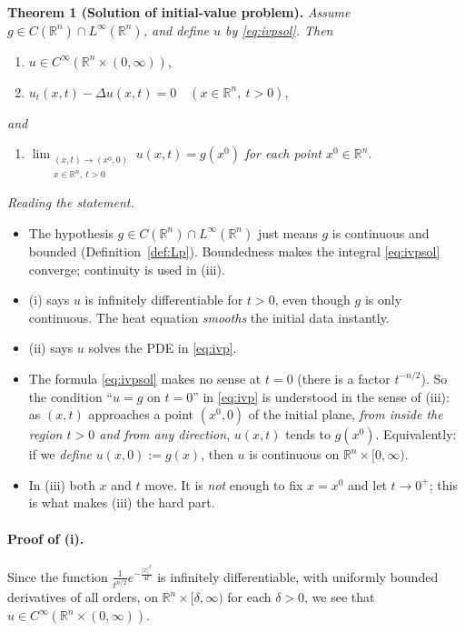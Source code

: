 \documentclass[11pt]{article}
\theoremstyle{plain}
\theoremstyle{definition}
\theoremstyle{remark}
\begin{document}
\bigskip
\textbf{Theorem 1 (Solution of initial-value problem).} \textit{Assume $g \in C(\mathbb{R}^n) \cap L^\infty(\mathbb{R}^n)$, and define $u$ by \eqref{eq:ivpsol}. Then}
\begin{enumerate}
    \item[(i)] $u \in C^\infty(\mathbb{R}^n \times (0,\infty))$,
    \item[(ii)] $u_t(x,t) - \Delta u(x,t) = 0 \quad (x \in \mathbb{R}^n,\ t > 0)$,
\end{enumerate}
\textit{and}
\begin{enumerate}
    \item[(iii)] $\displaystyle\lim_{\substack{(x,t)\to(x^0,0)\\ x\in\mathbb{R}^n,\ t>0}} u(x,t) = g(x^0)$ \textit{for each point $x^0 \in \mathbb{R}^n$.}
\end{enumerate}

\emph{Reading the statement.}
\begin{itemize}
    \item The hypothesis $g \in C(\mathbb{R}^n)\cap L^\infty(\mathbb{R}^n)$ just means $g$ is continuous and bounded (Definition~\ref{def:Lp}). Boundedness makes the integral \eqref{eq:ivpsol} converge; continuity is used in (iii).
    \item (i) says $u$ is infinitely differentiable for $t > 0$, even though $g$ is only continuous. The heat equation \emph{smooths} the initial data instantly.
    \item (ii) says $u$ solves the PDE in \eqref{eq:ivp}.
    \item The formula \eqref{eq:ivpsol} makes no sense at $t = 0$ (there is a factor $t^{-n/2}$). So the condition ``$u = g$ on $t = 0$'' in \eqref{eq:ivp} is understood in the sense of (iii): as $(x,t)$ approaches a point $(x^0,0)$ of the initial plane, \emph{from inside the region $t > 0$ and from any direction}, $u(x,t)$ tends to $g(x^0)$. Equivalently: if we \emph{define} $u(x,0) := g(x)$, then $u$ is continuous on $\mathbb{R}^n \times [0,\infty)$.
    \item In (iii) both $x$ and $t$ move. It is \emph{not} enough to fix $x = x^0$ and let $t \to 0^+$; this is what makes (iii) the hard part.
\end{itemize}

\paragraph{Proof of (i).} Since the function $\frac{1}{t^{n/2}}e^{-\frac{|x|^2}{4t}}$ is infinitely differentiable, with uniformly bounded derivatives of all orders, on $\mathbb{R}^n \times [\delta,\infty)$ for each $\delta > 0$, we see that $u \in C^\infty(\mathbb{R}^n \times (0,\infty))$.
\end{document}
